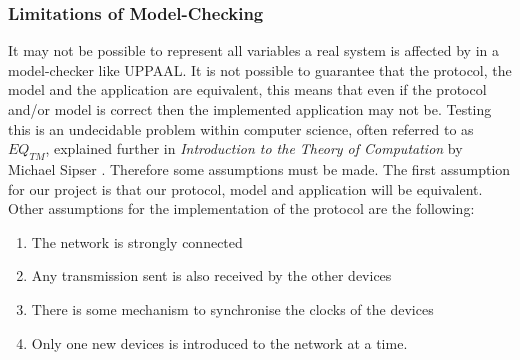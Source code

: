 \subsubsection{Limitations of Model-Checking}

It may not be possible to represent all variables a real system is affected by in a model-checker like UPPAAL.
It is not possible to guarantee that the protocol, the model and the application are equivalent, this means that even if the protocol and/or model is correct then the implemented application may not be. 
Testing this is an undecidable problem within computer science, often referred to as $EQ_{TM}$, explained further in \textit{Introduction to the Theory of Computation} by Michael Sipser \citep[p. 220]{Sipser}.
Therefore some assumptions must be made. 
The first assumption for our project is that our protocol, model and application will be equivalent.
Other assumptions for the implementation of the protocol are the following: 
\begin{enumerate}[label=\itshape \alph*\upshape)]
    \item The network is strongly connected
    \item Any transmission sent is also received by the other devices
    \item There is some mechanism to synchronise the clocks of the devices
    \item Only one new devices is introduced to the network at a time.
\end{enumerate}
